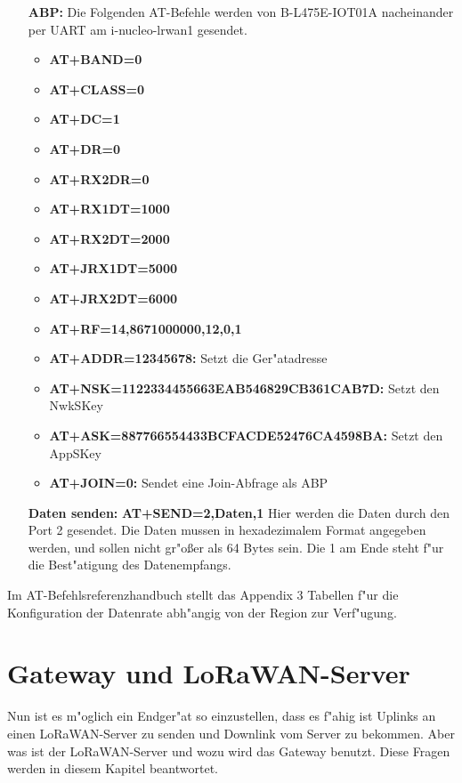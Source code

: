 \begin{itemize}
	\item[\textbf{ABP:}] Die Folgenden AT-Befehle werden von
	B-L475E-IOT01A nacheinander  per UART am i-nucleo-lrwan1 gesendet.
	\begin{itemize}
		\item \textbf{AT+BAND=0}
		\item \textbf{AT+CLASS=0} 
		\item \textbf{AT+DC=1}
		\item \textbf{AT+DR=0} 
		\item \textbf{AT+RX2DR=0}
		\item \textbf{AT+RX1DT=1000} 
		\item \textbf{AT+RX2DT=2000} 
		\item \textbf{AT+JRX1DT=5000}
		\item \textbf{AT+JRX2DT=6000} 
		\item \textbf{AT+RF=14,8671000000,12,0,1}
		\item \textbf{AT+ADDR=12345678:} Setzt die Ger"atadresse 
		\item \textbf{AT+NSK=1122334455663EAB546829CB361CAB7D:} Setzt
		den NwkSKey
		\item \textbf{AT+ASK=887766554433BCFACDE52476CA4598BA:} Setzt
		den AppSKey 
		\item \textbf{AT+JOIN=0:} Sendet eine Join-Abfrage als ABP
	\end{itemize}

	\item[\textbf{Daten senden:}] \textbf{AT+SEND=2,Daten,1}
	Hier werden die Daten durch den Port 2 gesendet. Die Daten mussen in
	hexadezimalem Format angegeben werden, und sollen nicht gr"o\ss{}er als 64 Bytes
	sein. Die 1 am Ende steht f"ur die Best"atigung des Datenempfangs. 
	
\end{itemize}

Im AT-Befehlsreferenzhandbuch stellt das Appendix 3 Tabellen f"ur die
Konfiguration der Datenrate abh"angig von der Region zur Verf"ugung.

\chapter{Gateway und LoRaWAN-Server}\label{G_S}

Nun ist es m"oglich ein Endger"at so einzustellen, dass es f"ahig ist
Uplinks an einen LoRaWAN-Server zu senden und Downlink vom Server zu
bekommen. Aber was ist der LoRaWAN-Server und wozu wird das Gateway
benutzt. Diese Fragen werden in diesem Kapitel beantwortet.

